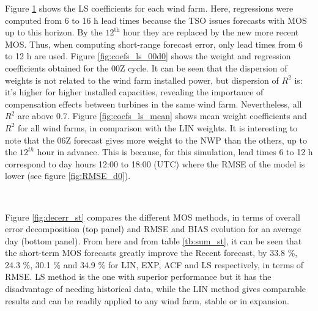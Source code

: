 Figure \ref{fig:coefs_ls} shows the LS coefficients for each wind farm. Here, regressions were computed from 6 to 16 h lead times because the TSO issues forecasts with MOS up to this horizon. By the $\mathrm{12^{th}}$ hour they are replaced by the new more recent MOS. Thus, when computing short-range forecast error, only lead times from 6 to 12 h are used. Figure \ref{fig:coefs_ls_00d0} shows the weight and regression coefficients obtained for the 00Z cycle. It can be seen that the dispersion of weights is not related to the wind farm installed power, but dispersion of $R^2$ is: it's higher for higher installed capacities, revealing the importance of compensation effects between turbines in the same wind farm. Nevertheless, all $R^2$ are above 0.7. Figure \ref{fig:coefs_ls_mean} shows mean weight coefficients and $R^2$ for all wind farms, in comparison with the LIN weights. It is interesting to note that the 06Z forecast gives more weight to the NWP than the others, up to the $12^{th}$ hour in advance. This is because, for this simulation, lead times 6 to 12 h correspond to day hours 12:00 to 18:00 (UTC) where the RMSE of the model is lower (see figure \ref{fig:RMSE_d0}).


\begin{figure}[!htp]
    \centering
    \\
    \label{fig:coefs_ls}
\end{figure}
\FloatBarrier

Figure \ref{fig:decerr_st} compares the different MOS methods, in terms of overall error decomposition (top panel) and RMSE and BIAS evolution for an average day (bottom panel). From here and from table \ref{tb:sum_st}, it can be seen that the short-term MOS forecasts greatly improve the Recent forecast, by 33.8 \%, 24.3 \%, 30.1 \% and 34.9 \% for LIN, EXP, ACF and LS respectively, in terms of RMSE. LS method is the one with superior performance but it has the disadvantage of needing historical data, while the LIN method gives comparable results and can be readily applied to any wind farm, stable or in expansion.

